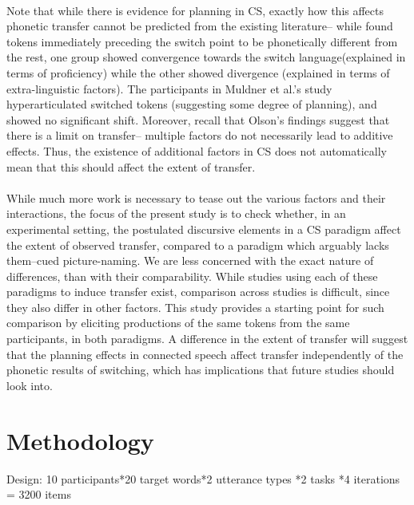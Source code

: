 \documentclass[11pt]{article}
\begin{document}
\paragraph{}Note that while there is evidence for planning in CS, exactly how this affects phonetic transfer cannot be predicted from the existing literature-- while \cite{bullock2009trying} found tokens immediately preceding the switch point to be phonetically different from the rest, one group showed convergence towards the switch language(explained in terms of proficiency) while the other showed divergence (explained in terms of extra-linguistic factors). The participants in Muldner et al.'s \citeyear{muldner2019phonetics} study hyperarticulated switched tokens (suggesting some degree of planning), and showed no significant shift. Moreover, recall that Olson's \citeyear{olson2016role} findings suggest that there is a limit on transfer-- multiple factors do not necessarily lead to additive effects. Thus, the existence of additional factors in CS does not automatically mean that this should affect the extent of transfer. 

\paragraph{}While much more work is necessary to tease out the various factors and their interactions, the focus of the present study is to check whether, in an experimental setting, the postulated discursive elements in a CS paradigm affect the extent of observed transfer, compared to a paradigm which arguably lacks them--cued picture-naming. We are less concerned with the exact nature of differences, than with their comparability. While studies using each of these paradigms to induce transfer exist, comparison across studies is difficult, since they also differ in other factors. This study provides a starting point for such comparison by eliciting productions of the same tokens from the same participants, in both paradigms. A difference in the extent of transfer will suggest that the planning effects in connected speech affect transfer independently of the phonetic results of switching, which has implications that future studies should look into. 


\section{Methodology} %
Design: 10 participants*20 target words*2 utterance types *2 tasks *4 iterations = 3200 items
\end{document}
